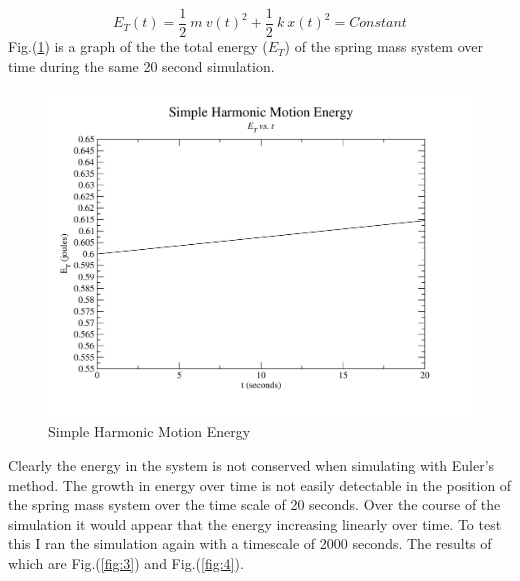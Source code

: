 \documentclass{article}
\begin{document}
\begin{equation}
\label{eq:13}
E_T(t) = \frac{1}{2} \ m \ v(t)^2 + 
			\frac{1}{2} \ k \ x(t)^2 =
			Constant
\end{equation}
Fig.(\ref{fig:2}) is a graph of the the total energy ($E_T$) of the spring mass system over time during the same 20 second simulation.

\begin{figure}[H]
\begin{center}
\includegraphics[scale=0.59]{./conservation}
\end{center}
\caption{Simple Harmonic Motion Energy}
\label{fig:2}
\end{figure} 

\noindent
Clearly the energy in the system is not conserved when simulating with Euler's method. The growth in energy over time is not easily detectable in the position of the spring mass system over the time scale of 20 seconds. Over the course of the simulation it would appear that the energy increasing linearly over time. To test this I ran the simulation again with a timescale of 2000 seconds. The results of which are Fig.(\ref{fig:3}) and Fig.(\ref{fig:4}).
\end{document}
